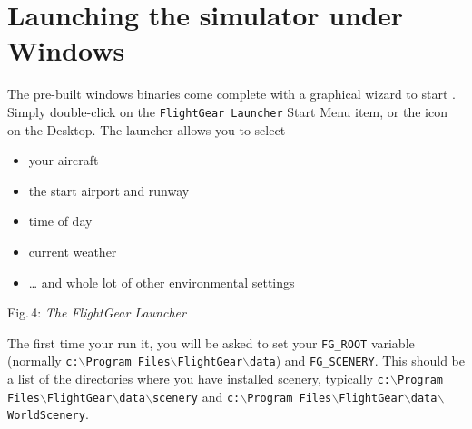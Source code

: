 \section{Launching the simulator under Windows}
The pre-built windows binaries come complete with a graphical wizard to start \FlightGear{}. Simply double-click on the \texttt{FlightGear Launcher} Start Menu item, or the icon on the Desktop. The launcher allows you to select
\begin{itemize}
\item your aircraft
\item the start airport and runway
\item time of day
\item current weather
\item \dots{} and whole lot of other environmental settings
\end{itemize}

 \centerline{}
\smallskip
\noindent
Fig.\,4: \textit{The FlightGear Launcher}

\medskip

The first time your run it, you will be asked to set your \texttt{FG\_ROOT} variable (normally \texttt{c:$\backslash$Program Files$\backslash$FlightGear$\backslash$data}) and \texttt{FG\_SCENERY}. This should be a list of the directories where you have installed scenery, typically \texttt{c:$\backslash$Program Files$\backslash$FlightGear$\backslash$data$\backslash$scenery} and \texttt{c:$\backslash$Program Files$\backslash$FlightGear$\backslash$data$\backslash$WorldScenery}.

